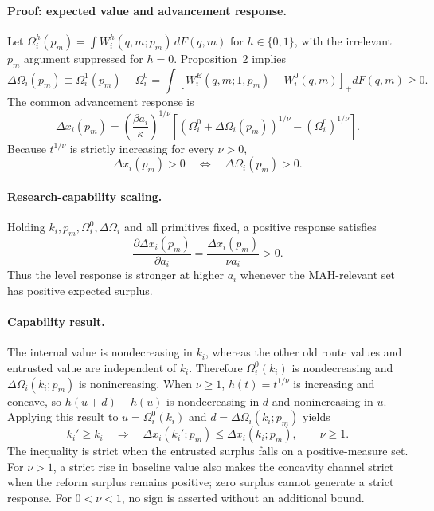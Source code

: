 \paragraph{Proof: expected value and advancement response.}
Let
\(\Omega_i^h(p_m)=\int W_i^h(q,m;p_m)\,dF(q,m)\) for
\(h\in\{0,1\}\), with the irrelevant \(p_m\) argument suppressed for
\(h=0\). Proposition~2 implies
\begin{equation}
  \Delta\Omega_i(p_m)
  \equiv
  \Omega_i^1(p_m)-\Omega_i^0
  =
  \int
  \left[W_i^E(q,m;1,p_m)-W_i^0(q,m)\right]_+
  dF(q,m)
  \geq0.
  \label{eq:p08-expected-gain}
\end{equation}
The common advancement response is
\begin{equation}
  \Delta x_i(p_m)
  =
  \left(\frac{\beta a_i}{\kappa}\right)^{1/\nu}
  \left[
    \left(\Omega_i^0+\Delta\Omega_i(p_m)\right)^{1/\nu}
    -
    \left(\Omega_i^0\right)^{1/\nu}
  \right].
  \label{eq:p08-advancement-change}
\end{equation}
Because \(t^{1/\nu}\) is strictly increasing for every \(\nu>0\),
\[
  \Delta x_i(p_m)>0
  \quad\Longleftrightarrow\quad
  \Delta\Omega_i(p_m)>0.
\]

\paragraph{Research-capability scaling.}
Holding \(k_i,p_m,\Omega_i^0,\Delta\Omega_i\) and all primitives fixed, a
positive response satisfies
\begin{equation}
  \frac{\partial\Delta x_i(p_m)}{\partial a_i}
  =
  \frac{\Delta x_i(p_m)}{\nu a_i}
  >0.
  \label{eq:p08-capability-response}
\end{equation}
Thus the level response is stronger at higher \(a_i\) whenever the
MAH-relevant set has positive expected surplus.

\paragraph{Capability result.}
The internal value is nondecreasing in \(k_i\), whereas the other old route
values and entrusted value are independent of \(k_i\). Therefore
\(\Omega_i^0(k_i)\) is nondecreasing and
\(\Delta\Omega_i(k_i;p_m)\) is nonincreasing. When \(\nu\geq1\),
\(h(t)=t^{1/\nu}\) is increasing and concave, so
\(h(u+d)-h(u)\) is nondecreasing in \(d\) and nonincreasing in \(u\).
Applying this result to \(u=\Omega_i^0(k_i)\) and
\(d=\Delta\Omega_i(k_i;p_m)\) yields
\begin{equation}
  k_i'\geq k_i
  \quad\Longrightarrow\quad
  \Delta x_i(k_i';p_m)
  \leq
  \Delta x_i(k_i;p_m),
  \qquad \nu\geq1.
  \label{eq:p08-manufacturing-response}
\end{equation}
The inequality is strict when the entrusted surplus falls on a
positive-measure set. For \(\nu>1\), a strict rise in baseline value
also makes the concavity channel strict when the reform surplus remains
positive; zero surplus cannot generate a strict response. For \(0<\nu<1\), no sign is asserted
without an additional bound.

